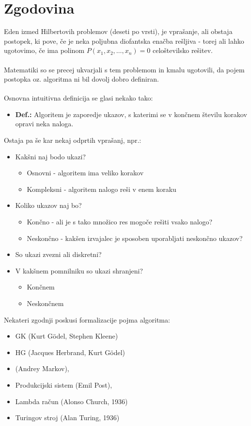 \documentclass[10pt,a4paper,oneside]{book}
\newcommand\br{%
\ \\ \\
}
\newenvironment{items}{
\begin{itemize}
	\setlength{\itemsep}{2pt}
	\setlength{\parskip}{0pt}
	\setlength{\parsep}{0pt}
	\setlength{\topsep}{0pt}
	\setlength{\leftskip}{0.15cm}
}{\end{itemize}}
\newcommand\Def[1]{%
\begin{items}%
	\item[\textbf{Def.:}]{#1}%
\end{items}%
}
\begin{document}
\section{Zgodovina}
Eden izmed Hilbertovih problemov (deseti po vrsti), je vprašanje, ali obstaja postopek, ki pove, če je neka poljubna diofantska enačba rešljiva - torej ali lahko ugotovimo, če ima polinom $P(x_1, x_2, \dots, x_n)=0$ celoštevilsko rešitev.
\br
Matematiki so se precej ukvarjali s tem problemom in kmalu ugotovili, da pojem postopka oz. algoritma ni bil dovolj dobro definiran.
\br
Osnovna intuitivna definicija se glasi nekako tako:
\Def{Algoritem je zaporedje ukazov,
s katerimi se v končnem številu korakov opravi neka naloga.}
Ostaja pa še kar nekaj odprtih vprašanj, npr.:
\begin{items}
\item Kakšni naj bodo ukazi? 
	\begin{items}
	\item Osnovni - algoritem ima veliko korakov
	\item Kompleksni - algoritem nalogo reši v enem koraku
	\end{items}
\item Koliko ukazov naj bo?
	\begin{items}
	\item Končno - ali je s tako množico res mogoče rešiti vsako nalogo?
	\item Neskončno - kakšen izvajalec je sposoben uporabljati neskončno ukazov?
	\end{items}
\item So ukazi zvezni ali diskretni?
\item V kakšnem pomnilniku so ukazi shranjeni?
	\begin{items}%
	\item Končnem
	\item Neskončnem
	\end{items}
\end{items}
Nekateri zgodnji poskusi formalizacije pojma algoritma:%
\begin{items}
    \item GK (Kurt Gödel, Stephen Kleene) 
    \item HG (Jacques Herbrand, Kurt Gödel)
    \item (Andrey Markov), %
    \item Produkcijski sistem (Emil Post), %
    \item Lambda račun (Alonso Church, 1936)
    \item Turingov stroj (Alan Turing, 1936)
\end{items}
\end{document}
